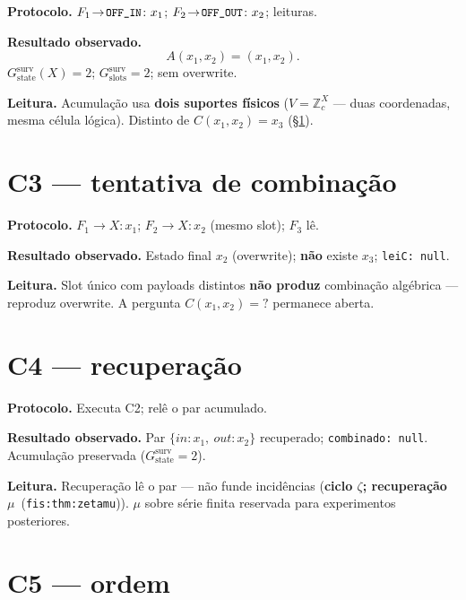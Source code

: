 \documentclass[11pt,a4paper]{article}
\newcommand{\code}[1]{\texttt{\small #1}}
\newcommand{\fis}[2]{\textbf{#2}~\textnormal{(\code{#1})}}
\begin{document}
\noindent\textbf{Protocolo.} $F_1\!\to\!\code{OFF\_IN}\colon x_1$;
$F_2\!\to\!\code{OFF\_OUT}\colon x_2$; leituras.

\medskip\noindent\textbf{Resultado observado.}
\[
A(x_1,x_2)=(x_1,x_2).
\]
$G_{\mathrm{state}}^{\mathrm{surv}}(X)=2$; $G_{\mathrm{slots}}^{\mathrm{surv}}=2$;
sem overwrite.

\medskip\noindent\textbf{Leitura.} Acumulação usa \textbf{dois suportes físicos}
($V=\mathbb{Z}_c^X$ --- duas coordenadas, mesma célula lógica). Distinto de
$C(x_1,x_2)=x_3$ (§\ref{comb:c3}).

\section{C3 --- tentativa de combinação}\label{comb:c3}

\noindent\textbf{Protocolo.} $F_1\!\to\!X\colon x_1$; $F_2\!\to\!X\colon x_2$
(mesmo slot); $F_3$ lê.

\medskip\noindent\textbf{Resultado observado.} Estado final $x_2$ (overwrite);
\textbf{não} existe $x_3$; \code{leiC: null}.

\medskip\noindent\textbf{Leitura.} Slot único com payloads distintos \textbf{não produz}
combinação algébrica --- reproduz overwrite. A pergunta $C(x_1,x_2)=?$ permanece aberta.

\section{C4 --- recuperação}\label{comb:c4}

\noindent\textbf{Protocolo.} Executa C2; relê o par acumulado.

\medskip\noindent\textbf{Resultado observado.} Par $\{in\colon x_1,\ out\colon x_2\}$
recuperado; \code{combinado: null}. Acumulação preservada ($G_{\mathrm{state}}^{\mathrm{surv}}=2$).

\medskip\noindent\textbf{Leitura.} Recuperação lê o par --- não funde incidências
(\fis{fis:thm:zetamu}{ciclo $\zeta$; recuperação $\mu$}). $\mu$ sobre série finita
reservada para experimentos posteriores.

\section{C5 --- ordem}\label{comb:c5}
\end{document}
